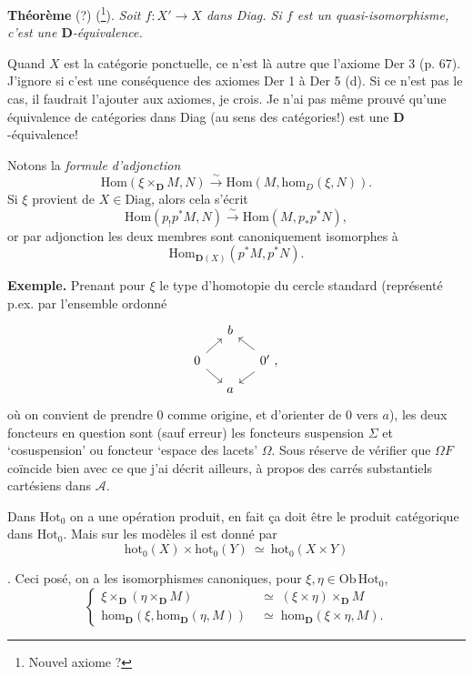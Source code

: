 \documentclass[11pt]{article}
\newcommand{\printedpage}[1]{\marginpar{\footnotesize p.~#1}}
\newcommand{\msp}[1]{\marginpar{\footnotesize [#1]}}
\newcommand{\Hot}{\mathrm{Hot}}
\newcommand{\D}{\mathbf{D}}
\newcommand{\hm}{\mathrm{hom}}
\newcommand{\Ob}{\mathrm{Ob}\,}
\begin{document}
\textbf{Théorème} (?) (\footnote{Nouvel axiome ?}). \textit{Soit $f : X' \longrightarrow X$ dans Diag. Si $f$ est un quasi-isomorphisme, c'est une $\D$-équivalence.}

Quand $X$ est la catégorie ponctuelle, ce n'est là autre que l'axiome Der 3 (p. 67). J'ignore si c'est une conséquence des axiomes Der 1 à Der 5 (d). Si ce n'est pas le cas, il faudrait l'ajouter aux axiomes, je crois. Je n'ai pas même prouvé qu'une équivalence de catégories dans Diag (au sens des catégories!) est une $\D$-équivalence!

Notons la \textit{formule d'adjonction}
\[
\mathrm{Hom}(\xi \times_{\D} M, N) \xrightarrow{\sim} \mathrm{Hom}(M, \hm_D(\xi, N)).
\tag*{(7)}
\] %
Si $\xi$ provient de $X \in \mathrm{Diag}$, alors cela s'écrit
\[
\mathrm{Hom}(p_!p^*M, N) \xrightarrow{\sim} \mathrm{Hom}(M, p_*p^*N),
\tag*{(8)}
\]
\msp{page 5}
or par adjonction les deux membres sont canoniquement isomorphes à
\[
\mathrm{Hom}_{\D(X)}(p^*M, p^*N).
\]

\textbf{Exemple.} Prenant pour $\xi$ le type d'homotopie du cercle standard (représenté p.ex. par l'ensemble ordonné
\[
\begin{tikzcd}[row sep=small, column sep=small]
 & b & \\
0 \arrow[ur] \arrow[dr] & & 0' \arrow[ul] \arrow[dl] \ , \\
 & a &
\end{tikzcd}
\]
où on convient de prendre 0 comme origine, et d'orienter de 0 vers $a$), les deux foncteurs en question sont (sauf erreur) les foncteurs suspension $\Sigma$ et `cosuspension' ou foncteur `espace des lacets' $\Omega$. Sous réserve de vérifier que $\Omega F$ coïncide bien avec ce que j'ai décrit ailleurs, à propos des carrés substantiels cartésiens dans $\mathcal{A}$.

Dans $\Hot_0$ on a une opération produit, en fait ça doit être le produit catégorique dans $\Hot_0$. Mais sur les modèles il est donné par
\[
\mathrm{hot}_0(X) \times \mathrm{hot}_0(Y) \ \simeq \ \mathrm{hot}_0(X \times Y)
\tag*{(8)}
\] %

\printedpage{4}

. Ceci posé, on a les isomorphismes canoniques, pour $\xi,\eta\in\Ob\Hot_0$,
\[
\left\{
\begin{aligned}
\xi\times_{\D}(\eta\times_{\D}M) &\;\simeq\; (\xi\times\eta)\times_{\D}M\\
\hm_{\D}(\xi,\hm_{\D}(\eta,M)) &\;\simeq\; \hm_{\D}(\xi\times\eta,M).
\end{aligned}
\right.
\tag*{(9)}
\]
\end{document}
